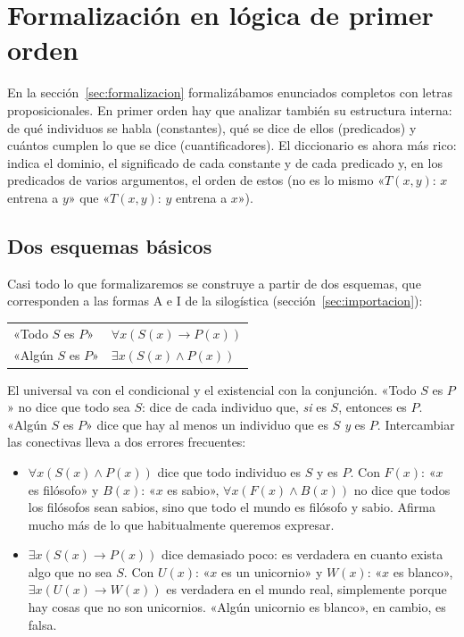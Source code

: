 \section{Formalización en lógica de primer orden}\label{sec:formalizacion-lpo}

En la sección~\ref{sec:formalizacion} formalizábamos enunciados
completos con letras proposicionales. En primer orden hay que analizar
también su estructura interna: de qué individuos se habla
(constantes), qué se dice de ellos (predicados) y cuántos cumplen lo
que se dice (cuantificadores). El diccionario es ahora más rico:
indica el dominio, el significado de cada constante y de cada
predicado y, en los predicados de varios argumentos, el orden de
estos (no es lo mismo «$T(x, y)$: $x$ entrena a $y$» que «$T(x, y)$: $y$ entrena a $x$»).

\subsection{Dos esquemas básicos}

Casi todo lo que formalizaremos se construye a partir de dos esquemas, que corresponden a las formas A e I de la silogística (sección~\ref{sec:importacion}):
\begin{center}
\renewcommand{\arraystretch}{1.3}
\begin{tabular}{|l|l|}
\hline
«Todo $S$ es $P$» & $\forall x (S(x) \to P(x))$ \\
«Algún $S$ es $P$» & $\exists x (S(x) \land P(x))$ \\
\hline
\end{tabular}
\end{center}
El universal va con el condicional y el existencial con la conjunción. «Todo $S$ es $P$» no dice que todo sea $S$: dice de cada individuo que, \emph{si} es $S$, entonces es $P$. «Algún $S$ es $P$» dice que hay al menos un individuo que es $S$ \emph{y} es $P$. Intercambiar las conectivas lleva a dos errores frecuentes:
\begin{itemize}
    \item $\forall x (S(x) \land P(x))$ dice que todo individuo es $S$
      y es $P$. Con $F(x)$: «$x$ es filósofo» y $B(x)$: «$x$ es
      sabio», $\forall x (F(x) \land B(x))$ no dice que todos los
      filósofos sean sabios, sino que todo el mundo es filósofo y
      sabio. Afirma mucho más de lo que habitualmente queremos
      expresar. 
    \item $\exists x (S(x) \to P(x))$ dice demasiado poco: es verdadera en cuanto exista algo que no sea $S$. Con $U(x)$: «$x$ es un unicornio» y $W(x)$: «$x$ es blanco», $\exists x (U(x) \to W(x))$ es verdadera en el mundo real, simplemente porque hay cosas que no son unicornios. «Algún unicornio es blanco», en cambio, es falsa.
\end{itemize}

